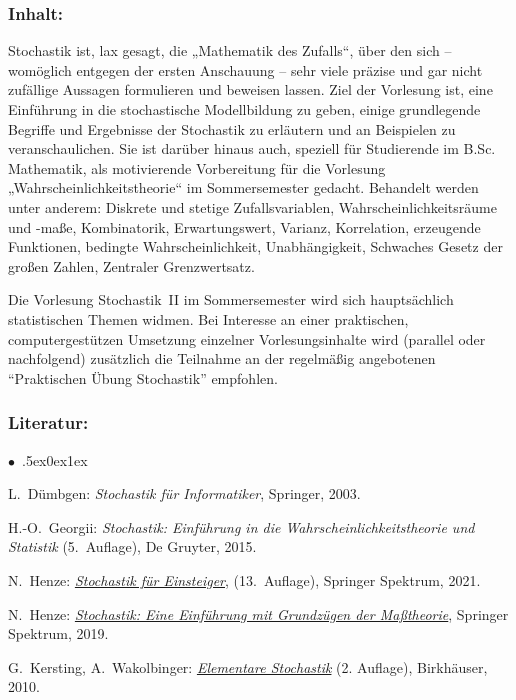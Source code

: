\documentclass[a4paper,10pt]{article}
\renewenvironment{itemize}{\begin{list}{$\bullet$\ }{\itemsep.5ex\setlength{\topsep}{0.5\itemsep}\parsep0ex\labelsep1ex\settowidth{\labelwidth}{$\bullet$\ }\setlength{\leftmargin}{\labelwidth}\addtolength{\leftmargin}{3ex}\addtolength{\leftmargin}{\labelsep}}}{\end{list}}
\begin{document}
\subsubsection*{\large
    Inhalt:
}
Stochastik ist, lax gesagt, die „Mathematik des Zufalls“, über den sich – womöglich entgegen der ersten Anschauung – sehr viele präzise und gar nicht zufällige Aussagen formulieren und beweisen lassen. Ziel der Vorlesung ist, eine Einführung in die stochastische Modellbildung zu geben, einige grundlegende Begriffe und Ergebnisse der Stochastik zu erläutern und an Beispielen zu veranschaulichen. Sie ist darüber hinaus auch, speziell für Studierende im B.Sc. Mathematik, als motivierende Vorbereitung für die Vorlesung „Wahrscheinlichkeitstheorie“ im Sommersemester gedacht. Behandelt werden unter anderem: Diskrete und stetige Zufallsvariablen, Wahrscheinlichkeitsräume und -maße, Kombinatorik, Erwartungswert, Varianz, Korrelation, erzeugende Funktionen, bedingte Wahrscheinlichkeit, Unabhängigkeit, Schwaches Gesetz der großen Zahlen, Zentraler Grenzwertsatz.

Die Vorlesung Stochastik~II im Sommersemester wird sich hauptsächlich statistischen Themen widmen. Bei Interesse an einer praktischen, computergestützen Umsetzung einzelner Vorlesungsinhalte wird (parallel oder nachfolgend) zusätzlich die Teilnahme an der regelmäßig angebotenen "`Praktischen Übung Stochastik"' empfohlen.
\subsubsection*{\large
    Literatur:
}
\begin{itemize}
\item L.~Dümbgen: \emph{Stochastik für Informatiker}, Springer, 2003.
\item H.-O.~Georgii: \emph{Stochastik: Einführung in die Wahrscheinlichkeitstheorie und Statistik} (5.~Auf\/lage), De Gruyter, 2015.
\item N.~Henze: \href{https://www.redi-bw.de/start/unifr/EBooks-springer/10.1007/978-3-662-63840-8}{\emph{Stochastik für Einsteiger}}, (13.~Auf\/lage), Springer Spektrum, 2021. 
\item  N.~Henze: \href{https://www.redi-bw.de/start/unifr/EBooks-springer/10.1007/978-3-662-59563-3}{\emph{Stochastik: Eine Einführung mit Grundzügen der Maßtheorie}}, Springer Spektrum, 2019. 
\item  G.~Kersting, A.~Wakolbinger: \href{http://www.redi-bw.de/start/unifr/EBooks-springer/10.1007/978-3-0346-0414-7}{\emph{Elementare Stochastik}} (2. Auf\/lage), Birkhäuser, 2010. 
\end{itemize}
\end{document}
